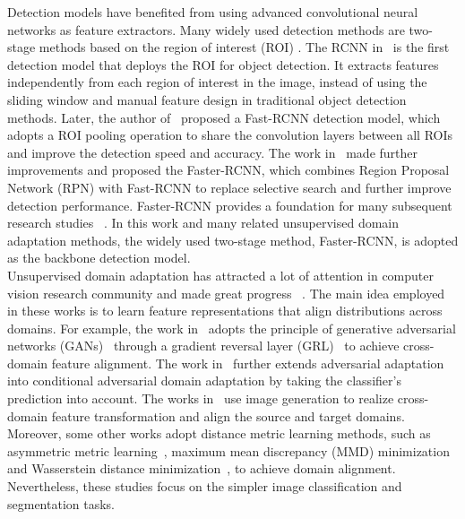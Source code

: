 \documentclass[runningheads]{llncs}
\begin{document}
Detection models have benefited from using
advanced convolutional neural networks 
as feature extractors. 
Many widely used detection methods are two-stage methods based on the region of interest (ROI)
\cite{girshick2014rich,girshick2015fast,ren2015faster}.
The RCNN in~\cite{girshick2014rich} is the first detection model 
that deploys the ROI for object detection. 
It extracts features independently from each region of interest in the image, 
instead of using the sliding window and manual feature design in traditional object detection methods. 
Later, the author of~\cite{girshick2015fast} proposed a Fast-RCNN detection model,
which adopts a ROI pooling operation to share the convolution layers between all ROIs 
and improve the detection speed and accuracy.
The work in~\cite{ren2015faster} made further improvements and proposed the Faster-RCNN, 
which combines Region Proposal Network (RPN) with Fast-RCNN to 
replace selective search and further improve detection performance.
Faster-RCNN provides a foundation for many subsequent research studies
~\cite{liu2016ssd,dai2016r,lin2017feature,he2017mask,redmon2018yolov3}.
In this work and many related unsupervised domain adaptation methods, 
the widely used two-stage method, Faster-RCNN, is adopted as the backbone detection model.
\\



Unsupervised domain adaptation has attracted a lot of attention in computer vision research community
and made great progress
~\cite{ganin2016domain,russo2018source,long2018conditional,kulis2011you,dziugaite2015training,shen2017wasserstein}. 
The main idea employed in these works is to learn feature representations that 
align distributions across domains.
For example, the work in~\cite{ganin2016domain} adopts the principle of  
generative adversarial networks (GANs)~\cite{goodfellow2014generative}
through a gradient reversal layer (GRL)~\cite{ganin2014unsupervised}
to achieve cross-domain feature alignment. 
The work in~\cite{long2018conditional} further extends adversarial adaptation
into conditional adversarial domain adaptation by taking the classifier's prediction into account.
The works in~\cite{russo2018source,choi2019self} use image generation to realize
cross-domain feature transformation 
and align the source and target domains. 
Moreover, some other works adopt distance metric learning methods, such as 
asymmetric metric learning~\cite{kulis2011you}, maximum mean discrepancy (MMD) minimization~\cite{dziugaite2015training} 
and Wasserstein distance minimization~\cite{shen2017wasserstein}, to achieve domain alignment. 
Nevertheless, these studies focus on the simpler image classification and segmentation tasks. 
\\
\end{document}
